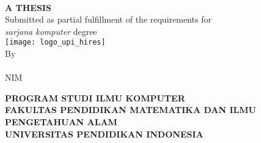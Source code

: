 \begin{titlepage}
    \begin{center}

        \begin{doublespace}
            \textbf{\MakeUppercase{\judul}}\\[1cm]
        \end{doublespace}
        \textbf{\MakeUppercase{A THESIS}}\\[1cm]
        Submitted as partial fulfillment of the requirements for\\
        \textit{sarjana komputer} degree\\[1cm]

        \texttt{[image: logo\_upi\_hires]}\\[1cm]
        By\\
        \penulis{}\\
        NIM \nim{}\\
        \vfill

        \textbf{\MakeUppercase{program studi ilmu komputer}}\\
        \textbf{\MakeUppercase{fakultas pendidikan matematika dan ilmu pengetahuan alam}}\\
        \textbf{\MakeUppercase{UNIVERSITAS PENDIDIKAN INDONESIA}}\\
        \textbf{\the\year{}}\\
    \end{center}
\end{titlepage}

